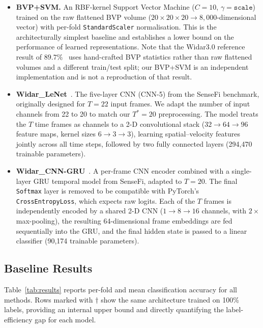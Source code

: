 \documentclass[journal]{IEEEtran}
\begin{document}
\begin{itemize}[leftmargin=*]

  \item \textbf{BVP+SVM.} An RBF-kernel Support Vector Machine
  ($C = 10$, $\gamma = \texttt{scale}$) trained on the raw flattened
  BVP volume ($20 \times 20 \times 20 \to 8{,}000$-dimensional
  vector) with per-fold \texttt{StandardScaler} normalisation.
  This is the architecturally simplest baseline and establishes a
  lower bound on the performance of learned representations.
  Note that the Widar3.0 reference result of
  $89.7\%$~\cite{zheng2019widar3} uses hand-crafted BVP statistics
  rather than raw flattened volumes and a different train/test split;
  our BVP+SVM is an independent implementation and is not a
  reproduction of that result.

  \item \textbf{Widar\_LeNet}~\cite{ma2023sensefi}. The five-layer
  CNN (CNN-5) from the SenseFi benchmark, originally designed for
  $T{=}22$ input frames.
  We adapt the number of input channels from 22 to 20 to match our
  $T^{*}{=}20$ preprocessing.
  The model treats the $T$ time frames as channels to a 2-D
  convolutional stack ($32 \to 64 \to 96$ feature maps, kernel sizes
  $6 \to 3 \to 3$), learning spatial--velocity features jointly
  across all time steps, followed by two fully connected layers
  (294{,}470 trainable parameters).

  \item \textbf{Widar\_CNN-GRU}~\cite{ma2023sensefi}. A per-frame
  CNN encoder combined with a single-layer GRU temporal model from
  SenseFi, adapted to $T{=}20$.
  The final \texttt{Softmax} layer is removed to be compatible with
  PyTorch's \texttt{CrossEntropyLoss}, which expects raw logits.
  Each of the $T$ frames is independently encoded by a shared 2-D
  CNN ($1 \to 8 \to 16$ channels, with $2\times$ max-pooling), the
  resulting 64-dimensional frame embeddings are fed sequentially
  into the GRU, and the final hidden state is passed to a linear
  classifier (90{,}174 trainable parameters).

\end{itemize}

\subsection{Baseline Results}
\label{sec:experiments:results}

Table~\ref{tab:results} reports per-fold and mean classification
accuracy for all methods.
Rows marked with $\dagger$ show the same architecture trained on
100\% labels, providing an internal upper bound and directly
quantifying the label-efficiency gap for each model.
\end{document}

